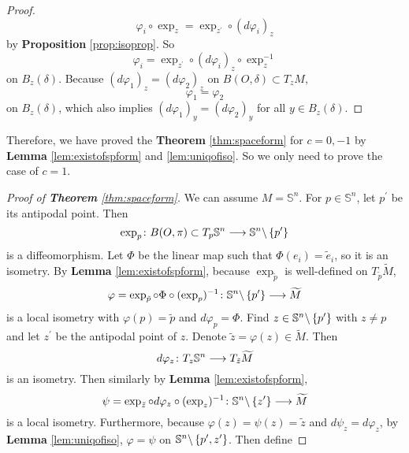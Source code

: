 \begin{enumerate}[label=\arabic{*}.]
\begin{proof}
\begin{equation*}
			\varphi_i\circ\exp_z = \exp_{z^\prime}\circ(d\varphi_i)_z
		\end{equation*}
		by \textbf{Proposition} \ref{prop:isoprop}. So
		\begin{equation*}
			\varphi_i = \exp_{z^\prime}\circ(d\varphi_i)_z \circ \exp_z^{-1}
		\end{equation*}
		on $B_z(\delta)$. Because $(d\varphi_1)_z = (d\varphi_2)_z$ on $B(O,\delta) \subset T_zM$,
		\begin{equation*}
			\varphi_1 = \varphi_2
		\end{equation*}
		on $B_z(\delta)$, which also implies $(d\varphi_1)_{y} = (d\varphi_2)_{y}$ for all $y \in B_z(\delta)$.
	\end{proof}
	Therefore, we have proved the \textbf{Theorem} \ref{thm:spaceform} for $c = 0, -1$ by \textbf{Lemma} \ref{lem:existofspform} and \ref{lem:uniqofiso}. So we only need to prove the case of $c = 1$.
	\begin{proof}[Proof of \textbf{Theorem} \ref{thm:spaceform}]
		We can assume $M = \mathbb{S}^n$. For $p \in \mathbb{S}^n$, let $p^\prime$ be its antipodal point. Then
		\begin{equation*}
			\exp_p \colon B(O,\pi) \subset T_p\mathbb{S}^n \longrightarrow \mathbb{S}^n \backslash \left\{p^\prime\right\}
		\end{equation*}
		is a diffeomorphism. Let $\Phi$ be the linear map such that $\Phi(e_i) = \tilde{e}_i$, so it is an isometry. By \textbf{Lemma} \ref{lem:existofspform}, because $\exp_{\tilde{p}}$ is well-defined on $T_{\tilde{p}}\widetilde{M}$,
		\begin{equation*}
			\varphi = \exp_{\tilde{p}} \circ \Phi \circ (\exp_p)^{-1} \colon \mathbb{S}^n \backslash \left\{p^\prime\right\} \longrightarrow \widetilde{M}
		\end{equation*}
		is a local isometry with $\varphi(p) = \tilde{p}$ and $d\varphi_p = \Phi$. Find $z \in \mathbb{S}^n \backslash \left\{p^\prime\right\}$ with $z \neq p$ and let $z^\prime$ be the antipodal point of $z$. Denote $\tilde{z} = \varphi(z) \in \widetilde{M}$. Then
		\begin{equation*}
			d\varphi_z \colon T_z\mathbb{S}^n \longrightarrow T_{\tilde{z}}\widetilde{M}
		\end{equation*}
		is an isometry. Then similarly by \textbf{Lemma} \ref{lem:existofspform},
		\begin{equation*}
			\psi = \exp_{\tilde{z}} \circ d\varphi_z \circ (\exp_z)^{-1} \colon \mathbb{S}^n \backslash \left\{z^\prime\right\} \longrightarrow \widetilde{M}
		\end{equation*}
		is a local isometry. Furthermore, because $\varphi(z) = \psi(z) = \tilde{z}$ and $d\psi_z = d\varphi_z$, by \textbf{Lemma} \ref{lem:uniqofiso}, $\varphi = \psi$ on $\mathbb{S}^n \backslash \left\{p^\prime,z^\prime\right\}$. Then define

\end{proof}
\end{enumerate}
